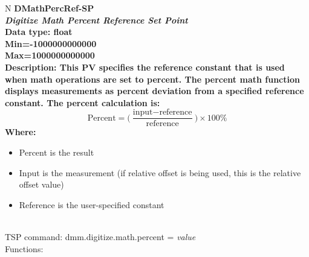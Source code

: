 \documentclass[openany]{article}
\begin{document}
		\begin{tabular}{N}
			\hline
			\bfseries DMathPercRef-SP\label{pv:dmathpercref-sp} \\ \hline
			\emph{Digitize Math Percent Reference Set Point} \\
			Data type: float \\
			Min=-1000000000000 \\
			Max=1000000000000 \\
			Description: This PV specifies the reference constant that is used when math operations are set to percent. The percent math function displays measurements as percent deviation from a specified reference constant. The percent calculation is: $$ \text{Percent} = \bigg(\frac{\text{input} - \text{reference}}{\text{reference}}\bigg)\times 100\% $$ Where: \begin{itemize} \item Percent is the result \item Input is the measurement (if relative offset is being used, this is the relative offset value) \item Reference is the user-specified constant \end{itemize} \\
			TSP command: dmm.digitize.math.percent = \emph{value} \\
			Functions: \\
			\arrayrulecolor{\FuncTableBorderColor}

		\end{tabular}
\end{document}
